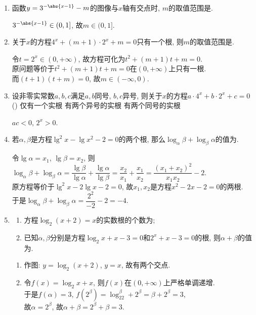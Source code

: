 \begin{enumerate}
    \item 函数$y=3^{-\abs{x-1}}-m$的图像与$x$轴有交点时, $m$的取值范围是\blkda{$(0,1]$}. 
    \begin{jieda}
    $3^{-\abs{x-1}}\in(0,1]$, 故$m\in(0,1]$. 
    \end{jieda}
    \item 关于$x$的方程$4^x+(m+1)\cdot2^x+m=0$只有一个根, 则$m$的取值范围是. 
    \begin{jieda}
    令$t=2^x\in(0,+\infty)$, 故方程可化为$t^2+(m+1)t+m=0$. \\
    原问题等价于$t^2+(m+1)t+m=0$在$(0,+\infty)$上只有一根. \\
    而$(t+1)(t+m)=0$, 故$m\in(-\infty,0)$.  
    \end{jieda}
    \item 设非零实常数$a,b,c$满足$a,b$同号, $b,c$异号, 则关于$x$的方程$a\cdot4^x+b\cdot2^x+c=0$\dotfill()
    {仅有一个实根}
    {有两个异号的实根}
    {有两个同号的实根}
    \begin{jieda}
    $ac<0$, $2^x>0$. 
    \end{jieda}

    \item 若$\alpha,\beta$是方程$\lg^2x-\lg{x^2}-2=0$的两个根, 那么$\log_{\alpha}\beta+\log_{\beta}\alpha$的值为. 
    
    \begin{jieda}
    令$\lg\alpha=x_1$, $\lg\beta=x_2$, 则$\log_{\alpha}\beta+\log_{\beta}\alpha=\dfrac{\lg\beta}{\lg\alpha}+\dfrac{\lg\alpha}{\lg\beta}=\dfrac{x_2}{x_1}+\dfrac{x_1}{x_2}=\dfrac{(x_1+x_2)^2}{x_1x_2}-2$. \\
    原方程等价于$\lg^2x-2\lg{x}-2=0$, 故$x_1,x_2$是方程$x^2-2x-2=0$的两根. \\
    于是$\log_{\alpha}\beta+\log_{\beta}\alpha=\dfrac{2^2}{-2}-2=-4$. 
    \end{jieda}

    \item
    \begin{enumerate}[(1)]
    \item 方程$\log_2(x+2)=x$的实数根的个数为; 
    \item 已知$\alpha,\beta$分别是方程$\log_2x+x-3=0$和$2^x+x-3=0$的根, 则$\alpha+\beta$的值为. 
    \end{enumerate}
    \begin{jieda}
    \begin{enumerate}[(1)]
    \item 作图: $y=\log_2(x+2)$, $y=x$, 故有两个交点. 
    \item 令$f(x)=\log_2x+x$, 则$f(x)$在$(0,+\infty)$上严格单调递增. \\
    于是$f(\alpha)=3$, $f(2^{\beta})=\log_22^{\beta}+2^{\beta}=\beta+2^{\beta}=3$, \\
    故$\alpha=2^\beta$, 故$\alpha+\beta=2^{\beta}+\beta=3$. 
    \end{enumerate}
    \end{jieda}


\end{enumerate}
